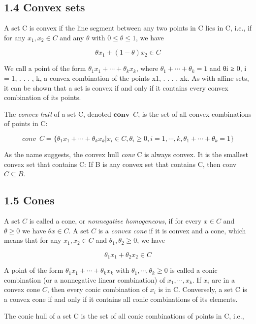 \documentclass{article}
\begin{document}
\subsection*{1.4 Convex sets}

A set C is convex if the line segment between any two points in C lies in C, i.e.,
if for any $x_1, x_2 \in C$ and any $\theta$ with $0 \le \theta\le 1$, we have

\[
    \theta x_1+(1-\theta)x_2\in C    
\]

We call a point of the form $\theta_1x_1 +\cdots+ \theta_k x_k$, where $\theta_1+\cdots+\theta_k=1$ and
θi ≥ 0, i = 1, . . . , k, a convex combination of the points x1, . . . , xk. As with affine sets, it can be shown that a set is convex if and only if it contains every convex
combination of its points.

The \textit{convex hull} of a set C, denoted $\mathbf{conv}\enspace C$, is the set of all convex combinations
of points in C:

\[
conv\enspace C=\{\theta_1x_1+\cdots+\theta_kx_k|x_i\in C, \theta_i\ge0, i=1,\cdots,k,\theta_1+\cdots+\theta_k=1\}    
\]

As the name suggests, the convex hull \textit{conv} C is always convex. It is the smallest
convex set that contains C: If B is any convex set that contains C, then conv $C \subseteq B$.



\subsection*{1.5 Cones}

A set $C$ is called a cone, or \textit{nonnegative homogeneous}, if for every $x \in C$ and $\theta \ge0$
we have $\theta x \in C$. A set $C$ is a \textit{convex cone} if it is convex and a cone, which means
that for any $x_1, x_2 \in C$ and $\theta_1, \theta_2 \ge 0$, we have 

\[
    \theta_1x_1+\theta_2x_2\in C    
\]

A point of the form $\theta_1x_1 + \cdots + \theta_k x_k$ with $\theta_1, \cdots , \theta_k \ge 0$ is called a conic
combination (or a nonnegative linear combination) of $x_1, \cdots , x_k$. If $x_i$ are in a
convex cone $C$, then every conic combination of $x_i$ is in C. Conversely, a set C is
a convex cone if and only if it contains all conic combinations of its elements. 

The conic hull of a set C is the set of all conic combinations of points in C, i.e.,
\end{document}
